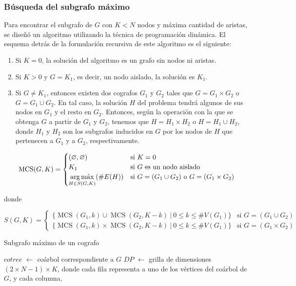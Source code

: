 \subsubsection{Búsqueda del subgrafo máximo}
Para encontrar el subgrafo de $G$ con $K < N$ nodos y máxima cantidad de
aristas, se diseñó un algoritmo utilizando la técnica de programación
dinámica. El esquema detrás de la formulación recursiva de este algoritmo es
el siguiente:

\begin{enumerate}
    \item Si $K = 0$, la solución del algoritmo es un grafo sin nodos ni
    aristas.
    \item Si $K > 0$ y $G = K_1$, es decir, un nodo aislado, la solución es
    $K_1$.
    \item Si $G \neq K_1$, entonces existen dos cografos $G_1$ y $G_2$ tales
    que $G = G_1 \times G_2$ o $G = G_1 \cup G_2$. En tal caso, la solución
    $H$ del problema tendrá algunos de sus nodos en $G_1$ y el resto en $G_2$.
    Entonces, según la operación con la que se obtenga $G$ a partir de $G_1$ y
    $G_2$, tenemos que $H = H_1 \times H_2$ o $H = H_1 \cup H_2$, donde
    $H_1$ y $H_2$ son los subgrafos inducidos en $G$ por los nodos de $H$ que
    pertenecen a $G_1$ y a $G_2$, respectivamente.
\end{enumerate}

\[
    \operatorname{MCS}(G, K) = \begin{cases}
        (\varnothing, \varnothing) & \text{si } K = 0 \\
        K_1 & \text{si } G \text{ es un nodo aislado} \\
        \displaystyle \argmax_{H \in S(G, K)}(\#E(H)) & \text{si } G = (G_1
        \cup G_2) \text{ o } G = (G_1 \times G_2) \\
    \end{cases}
\]

donde

\[
    S(G, K) = \begin{cases}
        \lbrace \operatorname{MCS}(G_1, k) \cup \operatorname{MCS}(G_2, K -
        k) \ \vert\ 0 \leq k \leq \#V(G_1) \rbrace & \text{si } G = (G_1 \cup G_2) \\
        \lbrace \operatorname{MCS}(G_1, k) \times \operatorname{MCS}(G_2, K -
        k) \ \vert\ 0 \leq k \leq \#V(G_1) \rbrace & \text{si } G = (G_1 \times G_2)
    \end{cases}
\]

\bigskip
\begin{algorithm}[H]
    \caption{Subgrafo máximo de un cografo}

    $cotree$ $\gets$ coárbol correspondiente a $G$ \;
    $DP$ $\gets$ grilla de dimensiones $(2 \times N - 1) \times K$, donde \;
    cada fila representa a uno de los vértices del coárbol de $G$, y cada \;
    columna,
\end{algorithm}
\bigskip

